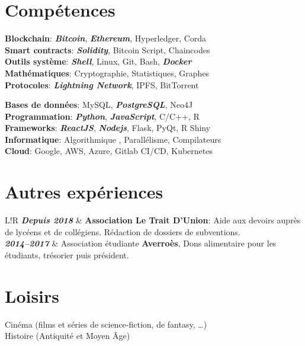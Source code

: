 \documentclass[10pt]{article}
\newcommand\VRule{\color{lightgray}\vrule width 2pt}
\begin{document}
\section*{Compétences}
\hspace*{1ex}
\begin{minipage}[ht]{0.50\textwidth}
\textbf{Blockchain}: \textbf{\textit{Bitcoin}}, \textbf{\textit{Ethereum}}, Hyperledger, Corda \\[0.1cm]
\textbf{Smart contracts}: \textbf{\textit{Solidity}}, Bitcoin Script, Chaincodes \\[0.1cm]
\textbf{Outils système}: \textbf{\textit{Shell}}, Linux, Git, Bash, \textbf{\textit{Docker}} \\[0.1cm] 
\textbf{Mathématiques}: Cryptographie, Statistiques, Graphes \\[0.1cm]
\textbf{Protocoles}: \textbf{\textit{Lightning Network}}, IPFS, BitTorrent \\
\end{minipage}
\begin{minipage}[ht]{0.50\textwidth}
\textbf{Bases de données}: MySQL, \textbf{\textit{PostgreSQL}}, Neo4J \\[0.1cm]
\textbf{Programmation}: \textbf{\textit{Python}}, \textbf{\textit{JavaScript}}, C/C++, R \\[0.1cm]
\textbf{Frameworks}: \textbf{\textit{ReactJS}}, \textbf{\textit{Nodejs}}, Flask, PyQt, R Shiny \\[0.1cm]
\textbf{Informatique}: Algorithmique , Parallélisme, Compilateurs \\[0.1cm]
\textbf{Cloud}: Google, AWS, Azure, Gitlab CI/CD, Kubernetes \\
\end{minipage}
\vspace{-5ex}
\section*{Autres expériences}
\begin{tabular}{L!{\VRule}R}
\textbf{\textit{Depuis 2018}} & \textbf{Association Le Trait D’Union}:
Aide aux devoirs auprès de lycéens et de collégiens. Rédaction de dossiers de subventions. \\[0.75cm]

\textbf{\textit{2014--2017}} & Association étudiante \textbf{Averroès}, Dons alimentaire pour les étudiants, trésorier puis président. \\
\end{tabular}
\section*{Loisirs}
\hspace*{1ex} Cinéma (films et séries de science-fiction, de fantasy, …) \\
\hspace*{1ex} Histoire (Antiquité et Moyen Âge) \\
\end{document}
